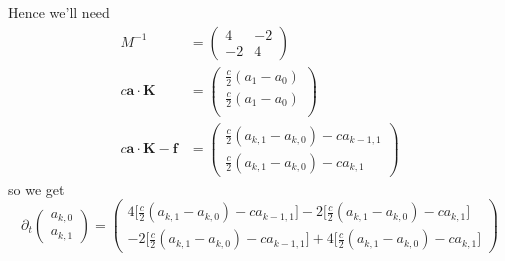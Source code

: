 \documentclass[12pt]{article}
\numberwithin{equation}{section}
\begin{document}
Hence we'll need
\begin{equation}
\begin{aligned}
M^{-1} &=
\begin{pmatrix}
4  & -2 \\
-2 & 4
\end{pmatrix} \\
c \bm{a} \cdot \bm{K} &=
\begin{pmatrix}
\frac{c}{2} (a_1 - a_0) \\
\frac{c}{2} (a_1 - a_0) \\
\end{pmatrix} \\
c \bm{a} \cdot \bm{K} - \bm{f} &= 
\begin{pmatrix}
\frac{c}{2} (a_{k,1} - a_{k,0}) - c a_{k-1,1} \\
\frac{c}{2} (a_{k,1} - a_{k,0}) - c a_{k,1}
\end{pmatrix}
\end{aligned}
\end{equation}
so we get
\begin{equation}
\partial_t 
\begin{pmatrix}
a_{k,0} \\
a_{k,1}
\end{pmatrix}
=
\begin{pmatrix}
4 \Big[ \frac{c}{2} (a_{k,1} - a_{k,0}) - c a_{k-1,1} \Big] - 2 \Big[ \frac{c}{2} (a_{k,1} - a_{k,0}) - c a_{k,1} \Big] \\
-2 \Big[ \frac{c}{2} (a_{k,1} - a_{k,0}) - c a_{k-1,1} \Big] + 4 \Big[ \frac{c}{2} (a_{k,1} - a_{k,0}) - c a_{k,1} \Big]
\end{pmatrix}
\end{equation}
\end{document}
